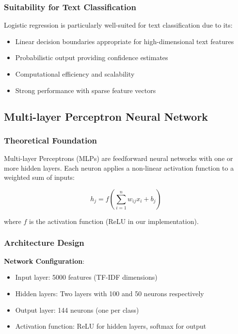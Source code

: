 \documentclass[11pt,a4paper]{article}
\begin{document}
\subsubsection{Suitability for Text Classification}

Logistic regression is particularly well-suited for text classification due to its:
\begin{itemize}
    \item Linear decision boundaries appropriate for high-dimensional text features
    \item Probabilistic output providing confidence estimates
    \item Computational efficiency and scalability
    \item Strong performance with sparse feature vectors
\end{itemize}

\subsection{Multi-layer Perceptron Neural Network}

\subsubsection{Theoretical Foundation}

Multi-layer Perceptrons (MLPs) are feedforward neural networks with one or more hidden layers. Each neuron applies a non-linear activation function to a weighted sum of inputs:

\begin{equation}
h_j = f\left(\sum_{i=1}^{n} w_{ij}x_i + b_j\right)
\end{equation}

where $f$ is the activation function (ReLU in our implementation).

\subsubsection{Architecture Design}

\textbf{Network Configuration}:
\begin{itemize}
    \item Input layer: 5000 features (TF-IDF dimensions)
    \item Hidden layers: Two layers with 100 and 50 neurons respectively
    \item Output layer: 144 neurons (one per class)
    \item Activation function: ReLU for hidden layers, softmax for output
\end{itemize}
\end{document}
